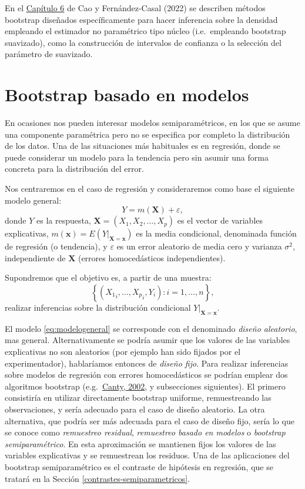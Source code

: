 \documentclass[
  spanish,
  10pt,
]{book}
\renewcommand{\mathbf}[1]{\symbf{#1}}
\theoremstyle{break}
\theoremstyle{nonumberplain}
\begin{document}
En el \href{https://rubenfcasal.github.io/book_remuestreo/npden.html}{Capítulo 6} de Cao y Fernández-Casal (2022) se describen métodos bootstrap diseñados específicamente para hacer inferencia sobre la densidad empleando el estimador no paramétrico tipo núcleo (i.e.~empleando bootstrap suavizado), como la construcción de intervalos de confianza o la selección del parámetro de suavizado.

\section{Bootstrap basado en modelos}\label{boot-reg}

En ocasiones nos pueden interesar modelos semiparamétricos, en los que se asume una componente paramétrica pero no se especifica por completo la distribución de los datos.
Una de las situaciones más habituales es en regresión, donde se puede considerar un modelo para la tendencia pero sin asumir una forma concreta para la distribución del error.

Nos centraremos en el caso de regresión y consideraremos como base el siguiente modelo general:
\begin{equation} 
  Y = m(\mathbf{X}) + \varepsilon,
  \label{eq:modelogeneral}
\end{equation}
donde \(Y\) es la respuesta, \(\mathbf{X}=(X_1, X_2, \ldots, X_p)\) es el vector de variables explicativas, \(m(\mathbf{x}) = E\left( \left. Y\right\vert_{\mathbf{X}=\mathbf{x}} \right)\) es la media condicional, denominada función de regresión (o tendencia), y \(\varepsilon\) es un error aleatorio de media cero y varianza \(\sigma^2\), independiente de \(\mathbf{X}\) (errores homocedásticos independientes).

Supondremos que el objetivo es, a partir de una muestra:
\[\left\{ \left( {X_1}_i, \ldots, {X_p}_i, Y_{i} \right)  : i = 1, \ldots, n \right\},\]
realizar inferencias sobre la distribución condicional
\(\left.Y \right\vert_{\mathbf{X}=\mathbf{x}}\).

El modelo \eqref{eq:modelogeneral} se corresponde con el denominado \emph{diseño aleatorio}, mas general.
Alternativamente se podría asumir que los valores de las variables explicativas no son aleatorios (por ejemplo han sido fijados por el experimentador), hablaríamos entonces de \emph{diseño fijo}.
Para realizar inferencias sobre modelos de regresión con errores homocedásticos se podrían emplear dos algoritmos bootstrap (e.g.~\href{http://cran.fhcrc.org/doc/Rnews/Rnews_2002-3.pdf}{Canty, 2002}, y subsecciones siguientes).
El primero consistiría en utilizar directamente bootstrap uniforme, remuestreando las observaciones, y sería adecuado para el caso de diseño aleatorio.
La otra alternativa, que podría ser más adecuada para el caso de diseño fijo, sería lo que se conoce como \emph{remuestreo residual}, \emph{remuestreo basado en modelos} o \emph{bootstrap semiparamétrico}.
En esta aproximación se mantienen fijos los valores de las variables explicativas y se remuestrean los residuos.
Una de las aplicaciones del bootstrap semiparamétrico es el contraste de hipótesis en regresión, que se tratará en la Sección \ref{contrastes-semiparametricos}.
\end{document}
